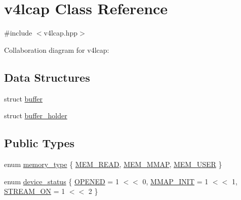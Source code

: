 \hypertarget{classv4lcap}{}\section{v4lcap Class Reference}
\label{classv4lcap}


{\ttfamily \#include $<$v4lcap.\+hpp$>$}



Collaboration diagram for v4lcap\+:
\subsection*{Data Structures}
\begin{DoxyCompactItemize}
\item 
struct \hyperlink{structv4lcap_1_1buffer}{buffer}
\item 
struct \hyperlink{structv4lcap_1_1buffer__holder}{buffer\+\_\+holder}
\end{DoxyCompactItemize}
\subsection*{Public Types}
\begin{DoxyCompactItemize}
\item 
enum \hyperlink{classv4lcap_aae799230441b7965d8947b104d8d753e}{memory\+\_\+type} \{ \hyperlink{classv4lcap_aae799230441b7965d8947b104d8d753eaa973888f299d63462efa19c3e52d416c}{M\+E\+M\+\_\+\+R\+E\+AD}, 
\hyperlink{classv4lcap_aae799230441b7965d8947b104d8d753ea910bccf6fae3859b962b253fca85ad2a}{M\+E\+M\+\_\+\+M\+M\+AP}, 
\hyperlink{classv4lcap_aae799230441b7965d8947b104d8d753ea30efcf7ca101412a17c617333e1bb064}{M\+E\+M\+\_\+\+U\+S\+ER}
 \}
\item 
enum \hyperlink{classv4lcap_a54af28c37f6a06c466390050290b8a5f}{device\+\_\+status} \{ \hyperlink{classv4lcap_a54af28c37f6a06c466390050290b8a5fa4015ad97149ce726bbc1843cb9527972}{O\+P\+E\+N\+ED} = 1 $<$$<$ 0, 
\hyperlink{classv4lcap_a54af28c37f6a06c466390050290b8a5fa13fe1706c834cc277398a59fa0722bdb}{M\+M\+A\+P\+\_\+\+I\+N\+IT} = 1 $<$$<$ 1, 
\hyperlink{classv4lcap_a54af28c37f6a06c466390050290b8a5fa50f1c16a61587c54c5bf5f95b3802625}{S\+T\+R\+E\+A\+M\+\_\+\+ON} = 1 $<$$<$ 2
 \}
\end{DoxyCompactItemize}
